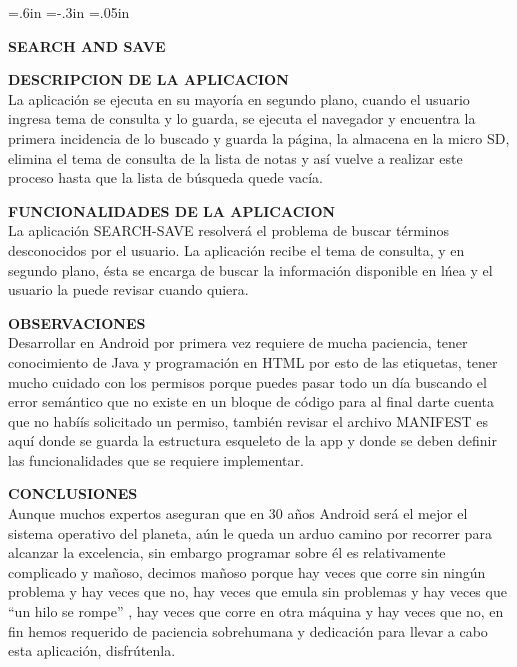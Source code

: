 {\leftskip=.6in  \parindent=-.3in  \parskip=.05in

\bigskip

\centerline {\namefont \LARGE \bf SEARCH AND SAVE}
\bigskip
\bigskip
\bigskip

{\bf DESCRIPCION DE LA APLICACION}
\bigskip
\\La aplicaci\'on se ejecuta en su mayor\'ia en segundo plano, cuando el usuario ingresa tema de consulta y lo guarda, se ejecuta el navegador y encuentra la primera incidencia de lo buscado y guarda la p\'agina, la almacena en la micro SD, elimina el tema de consulta de la lista de notas y as\'i vuelve a realizar este proceso hasta que la lista de b\'usqueda quede vac\'ia.
\bigskip
\bigskip

{\bf FUNCIONALIDADES DE LA APLICACION}
\bigskip
\\La aplicaci\'on SEARCH-SAVE resolver\'a el problema de buscar t\'erminos desconocidos por el usuario. La aplicaci\'on recibe el tema de consulta, y en segundo plano, \'esta se encarga de buscar la informaci\'on disponible en l\'nea y el usuario la puede revisar cuando quiera.   
\bigskip
\bigskip

{\bf OBSERVACIONES}
\bigskip
\\Desarrollar en Android por primera vez requiere de mucha paciencia, tener conocimiento de Java y programaci\'on en HTML por esto  de las etiquetas, tener mucho cuidado con los permisos porque puedes pasar todo un d\'ia buscando el error sem\'antico  que no existe en un bloque de c\'odigo para al final darte cuenta que no habí\'is solicitado un permiso, tambi\'en revisar el archivo MANIFEST es aqu\'i donde se guarda la estructura esqueleto de la app y donde se deben definir las funcionalidades que se requiere implementar.   
\bigskip
\bigskip

{\bf CONCLUSIONES}
\bigskip
\\Aunque muchos expertos aseguran que en 30 a\~nos Android ser\'a el mejor el sistema operativo del planeta, a\'un le queda un arduo camino por recorrer para alcanzar la excelencia, sin embargo programar sobre \'el es relativamente complicado y ma\~noso, decimos ma\~noso porque hay veces que corre sin ning\'un problema y hay veces que no, hay veces que emula sin problemas y hay veces que “un hilo se rompe” , hay veces que corre en otra m\'aquina y hay veces que no, en fin hemos requerido de paciencia sobrehumana y dedicaci\'on para llevar a cabo esta aplicaci\'on, disfr\'utenla.
\bigskip
\bigskip

}
